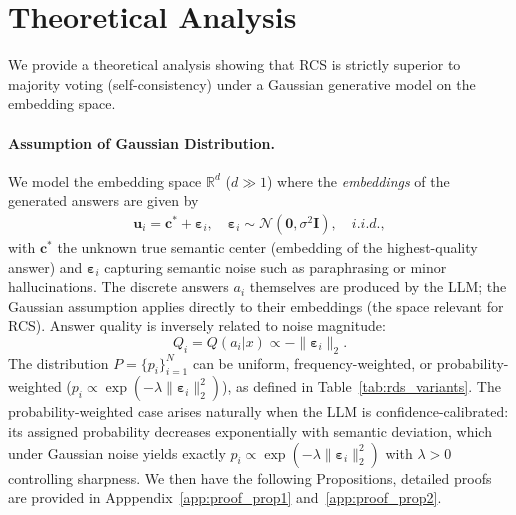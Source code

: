 \section{Theoretical Analysis}
We provide a theoretical analysis showing that RCS is strictly superior to majority voting (self-consistency) under a Gaussian generative model on the embedding space.

\paragraph{Assumption of Gaussian Distribution.}
We model the embedding space \(\mathbb{R}^d\) (\(d \gg 1\)) where the \emph{embeddings} of the generated answers are given by
\begin{align}
\mathbf{u}_i = \mathbf{c}^* + \boldsymbol{\varepsilon}_i, \quad \boldsymbol{\varepsilon}_i \sim \mathcal{N}(\mathbf{0}, \sigma^2 \mathbf{I}), \quad i.i.d.,
\end{align}
with \(\mathbf{c}^*\) the unknown true semantic center (embedding of the highest-quality answer) and \(\boldsymbol{\varepsilon}_i\) capturing semantic noise such as paraphrasing or minor hallucinations. The discrete answers \(a_i\) themselves are produced by the LLM; the Gaussian assumption applies directly to their embeddings (the space relevant for RCS). Answer quality is inversely related to noise magnitude:
\[
Q_i = Q(a_i | x) \propto -\|\boldsymbol{\varepsilon}_i\|_2.
\]
The distribution \(P{=}\{p_i\}_{i=1}^N\) can be uniform, frequency-weighted, or probability-weighted (\(p_i \propto \exp(-\lambda \|\boldsymbol{\varepsilon}_i\|_2^2)\)), as defined in Table~\ref{tab:rds_variants}. The probability-weighted case arises naturally when the LLM is confidence-calibrated: its assigned probability decreases exponentially with semantic deviation, which under Gaussian noise yields exactly \(p_i \propto \exp(-\lambda \|\boldsymbol{\varepsilon}_i\|_2^2)\) with \(\lambda > 0\) controlling sharpness. We then have the following Propositions, detailed proofs are provided in Apppendix~\ref{app:proof_prop1} and~\ref{app:proof_prop2}.

